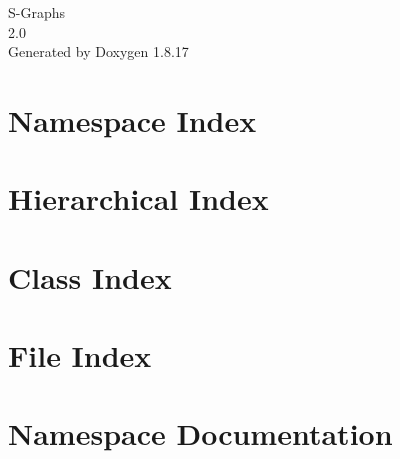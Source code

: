 \let\mypdfximage\pdfximage\def\pdfximage{\immediate\mypdfximage}\documentclass[twoside]{book}
\newcommand{\+}{\discretionary{\mbox{\scriptsize$\hookleftarrow$}}{}{}}
\newcommand{\clearemptydoublepage}{%
  \newpage{\pagestyle{empty}\cleardoublepage}%
}
\begin{document}
\hypersetup{pageanchor=false,
             bookmarksnumbered=true,
             pdfencoding=unicode
            }
\begin{titlepage}
\vspace*{7cm}
\begin{center}%
{\Large S-\/\+Graphs \\[1ex]\large 2.\+0 }\\
\vspace*{1cm}
{\large Generated by Doxygen 1.8.17}\\
\end{center}
\end{titlepage}
\clearemptydoublepage
{}
\tableofcontents
\clearemptydoublepage
{}
\hypersetup{pageanchor=true}

\chapter{Namespace Index}

\chapter{Hierarchical Index}

\chapter{Class Index}

\chapter{File Index}

\chapter{Namespace Documentation}


\end{document}
